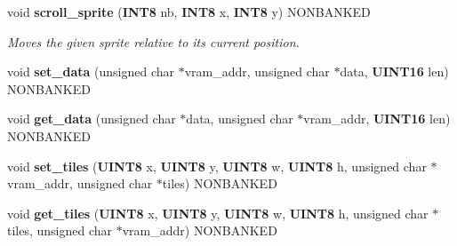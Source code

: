 \begin{CompactItemize}
\item 
\label{gb.h_a95}
void {\bf scroll\_\-sprite} ({\bf INT8} nb, {\bf INT8} x, {\bf INT8} y) NONBANKED
\begin{CompactList}\small\item\em Moves the given sprite relative to its current position.\item\end{CompactList}

\item 
\label{gb.h_a96}
void {\bf set\_\-data} (unsigned char $\ast$vram\_\-addr, unsigned char $\ast$data, {\bf UINT16} len) NONBANKED
\item 
\label{gb.h_a97}
void {\bf get\_\-data} (unsigned char $\ast$data, unsigned char $\ast$vram\_\-addr, {\bf UINT16} len) NONBANKED
\item 
\label{gb.h_a98}
void {\bf set\_\-tiles} ({\bf UINT8} x, {\bf UINT8} y, {\bf UINT8} w, {\bf UINT8} h, unsigned char $\ast$vram\_\-addr, unsigned char $\ast$tiles) NONBANKED
\item 
\label{gb.h_a99}
void {\bf get\_\-tiles} ({\bf UINT8} x, {\bf UINT8} y, {\bf UINT8} w, {\bf UINT8} h, unsigned char $\ast$tiles, unsigned char $\ast$vram\_\-addr) NONBANKED
\end{CompactItemize}
